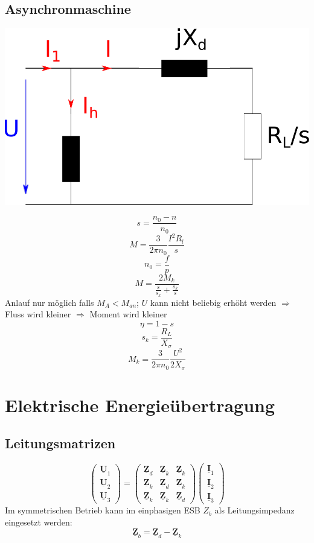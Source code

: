 \documentclass[9pt,a4paper]{scrartcl}
\renewcommand{\vec}[1]{\ensuremath{\underline{\boldsymbol {#1}}}}
\newcommand{\Ra}[0]{\ensuremath{\Rightarrow}}									%
\begin{document}
\begin{multicols}{3}
		\subsection{Asynchronmaschine}		
		\begin{center}
		\includegraphics[scale=.4]{./img/ersatzschaltbild_asynchronmaschine.pdf}
		\end{center}		 
		\[s = \frac{n_0 - n}{n_0}\]
		\[M = \frac{3}{2 \pi n_0} \frac{I^2 R_l}{s}\]
		\[n_0 = \frac{f}{p}\]
		\[M = \frac{2 M_k}{\frac{s}{s_k} + \frac{s_k}{s}}\]
		Anlauf nur möglich falls $M_A < M_{an}$; $U$ kann nicht beliebig erhöht werden $\Ra$ Fluss wird kleiner $\Ra$ Moment wird kleiner		
		\[\eta = 1 - s\]
		\[s_k = \frac{R_L}{X_\sigma}\]
		\[M_k = \frac{3}{2 \pi n_0} \frac{U^2}{2 X_\sigma}\]		
		
	\section{Elektrische Energieübertragung}	
		\subsection{Leitungsmatrizen}		
		
		\[\begin{pmatrix} \vec U_1 \\ \vec U_2 \\ \vec U_3 \end{pmatrix} = \begin{pmatrix} \vec Z_d & \vec Z_k & \vec Z_k \\ \vec Z_k & \vec Z_d & \vec Z_k \\ \vec Z_k & \vec Z_k & \vec Z_d \end{pmatrix} \begin{pmatrix} \vec I_1 \\ \vec I_2 \\ \vec I_3 \end{pmatrix}\]
		Im symmetrischen Betrieb kann im einphasigen ESB $Z_b$ als Leitungsimpedanz eingesetzt werden:
		\[\vec Z_b = \vec Z_d - \vec Z_k\]
		

\end{multicols}
\end{document}
